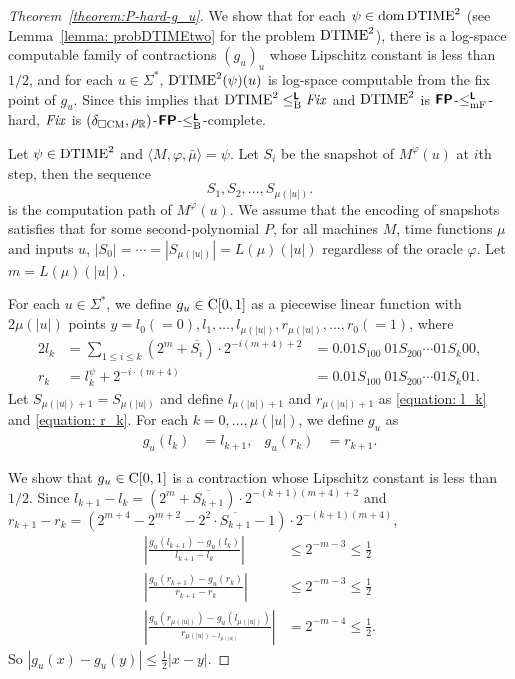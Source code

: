 \documentclass[a4paper,UKenglish]{lipics}
\begin{document}
\begin{proof}[Theorem~\ref{theorem:P-hard-g_u}]
 We show that for each $\psi \in \mathop{\rm dom} \mathrm{DTIME}^2$
 (see Lemma~\ref{lemma: probDTIMEtwo} for the problem $\mathrm{DTIME}^2$),
 there is a log-space computable family of contractions $(g_u)_u$ whose
 Lipschitz constant is less than $1/2$,
 and for each $u \in \Sigma^*$, $\mathrm{DTIME}^2(\psi)(u)$ is log-space 
 computable from the fix point of $g_u$.
 Since this implies that $\mathrm{DTIME}^2 \leq _{\mathrm B} ^{\text{\bfseries \sffamily \upshape L}} \mathit{Fix}$ and $\mathrm{DTIME}^2$
 is $\text{\bfseries \sffamily \upshape FP}$-$\leq _{\mathrm{mF}} ^{\text{\bfseries \sffamily \upshape L}}$-hard, $\mathit{Fix}$ is 
 $(\delta _{\square \mathrm{CM}}, \rho _\mathbb R)$-$\text{\bfseries \sffamily \upshape FP}$-$\leq _{\mathrm B} ^{\text{\bfseries \sffamily \upshape L}}$-complete.

 Let $\psi \in \mathrm{DTIME}^2$ and $\langle M, \varphi, \bar \mu \rangle = \psi$.
 Let $S_i$ be the snapshot of $M^\varphi(u)$ at $i$th step, then the sequence
 \begin{equation}
  S_1, S_2, \dots, S_{\mu(|u|)}.
 \end{equation}
 is the computation path of $M^\varphi(u)$.
 We assume that the encoding of snapshots satisfies that 
 for some second-polynomial $P$, for all machines $M$, time functions $\mu$ 
 and inputs $u$, $|S_0| = \cdots = |S_{\mu(|u|)}| = L(\mu)(|u|)$
 regardless of the oracle $\varphi$.
 Let $m = L(\mu)(|u|)$.


 For each $u \in \Sigma^*$, we define $g_u \in \mathrm C[0,1]$ as
 a piecewise linear function with $2\mu(|u|)$ points
 $y = l_0 (=0), l_1, \dots, l_{\mu(|u|)}, r_{\mu(|u|)}, \dots, r_0(=1)$,
 where
\begin{alignat}{2}
 \label{equation: l_k}
 l_k 
 &
 = \sum_{1 \le i \le k} (2^m+\overline{S_i}) \cdot 2^{-i(m+4)+2} 
 &
 = 0.01S_100\ 01S_200 \cdots 01S_k00,
 \\
 \label{equation: r_k}
 r_k
 &
 = l^\psi_k + 2^{-i \cdot (m+4)}
 &
 = 0.01S_100\ 01S_200 \cdots 01S_k01.
\end{alignat}
 Let $S_{\mu(|u|)+1} = S_{\mu(|u|)}$ and
 define $l_{\mu(|u|)+1}$ and $r_{\mu(|u|)+1}$ as
 \eqref{equation: l_k} and \eqref{equation: r_k}.
 For each $k = 0, \dots, \mu(|u|)$,
 we define $g_u$ as
 \begin{align}
 g_u(l_k) &= l_{k+1},
 &
 g_u(r_k) &= r_{k+1}.
 \end{align}

 We show that $g_u \in \mathrm C[0,1]$ is a contraction whose Lipschitz constant
 is less than $1/2$.
 Since $l_{k+1} - l_{k} = (2^m+\overline{S_{k+1}}) \cdot 2^{-(k+1)(m+4)+2} $
 and $r_{k+1} - r_{k} = (2^{m+4} - 2^{m+2} - 2^2 \cdot \overline{S_{k+1}} - 1)
 \cdot 2^{-(k+1)(m+4)} $,
\begin{align}
 \left|\frac{g_u(l_{k+1}) - g_u(l_k)}{l_{k+1} - l_k} \right| 
 &
 \le 2^{-m-3} \le \frac 1 2
 \\
 \left|\frac{g_u(r_{k+1}) - g_u(r_k)}{r_{k+1} - r_k} \right| 
 &
 \le 2^{-m-3} \le \frac 1 2
 \\
 \left|\frac{g_u(r_{\mu(|u|)}) - g_u(l_{\mu(|u|)})}{r_{\mu(|u|) - l_{\mu(|u|)}}} \right| 
 &
 = 2^{-m-4} \le \frac 1 2.
\end{align}
 So $|g_u(x) - g_u(y)| \le \frac 1 2 |x-y|$.


\end{proof}
\end{document}
